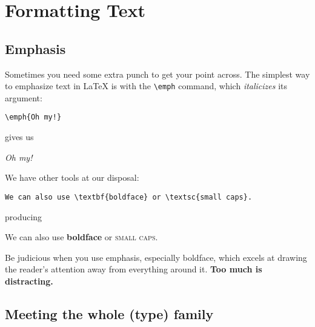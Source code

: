 \chapter{Formatting Text}
\label{formatting}

\section{Emphasis}

Sometimes you need some extra punch to get your point across.
The simplest way to emphasize text in \LaTeX{} is with the \verb|\emph| command,
which \emph{italicizes} its argument:
\begin{leftfigure}
\begin{lstlisting}
\emph{Oh my!}
\end{lstlisting}
\end{leftfigure}
gives us
\begin{leftfigure}
\lm \emph{Oh my!}
\end{leftfigure}
We have other tools at our disposal:
\begin{leftfigure}
\begin{lstlisting}
We can also use \textbf{boldface} or \textsc{small caps}.
\end{lstlisting}
\end{leftfigure}
producing
\begin{leftfigure}
\lm%
We can also use \textbf{boldface} or \textsc{small caps}.
\end{leftfigure}
Be judicious when you use emphasis, especially boldface,
which excels at drawing the reader's attention away from everything around it.
\textbf{Too much is distracting.}

\section{Meeting the whole (type) family}

